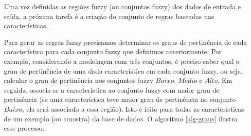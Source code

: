 \documentclass[template.tex]{subfiles}
\begin{document}

Uma vez definidas as regiões fuzzy (ou conjuntos fuzzy) dos dados de entrada e saída, a próxima tarefa é a criação do conjunto de regras baseadas nas características. %
%


Para gerar as regras fuzzy precisamos determinar os graus de pertinência de cada característica para cada conjunto fuzzy que definimos anteriormente. Por exemplo, considerando a modelagem com três conjuntos, é preciso saber qual o grau de pertinência de uma dada característica em cada conjunto fuzzy, ou seja, calcular o grau de pertinência nos conjuntos fuzzy $Baixo$, $Medio$ e $Alto$. Em seguida, associa-se a característica ao conjunto fuzzy com maior grau de pertinência (se uma característica teve maior grau de pertinência no conjunto $Baixo$, ela será associado a essa região). Isto é feito para todas as características de um exemplo (ou amostra) da base de dados. O algoritmo \ref{alg-graus} ilustra esse processo. 
\end{document}
